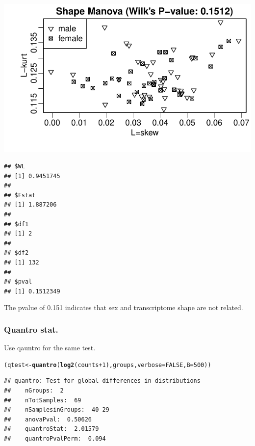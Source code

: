 \documentclass{article}\usepackage[]{graphicx}\usepackage[usenames,dvipsnames]{color}
\makeatletter
\def\maxwidth{ %
  \ifdim\Gin@nat@width>\linewidth
    \linewidth
  \else
    \Gin@nat@width
  \fi
}
\newcommand{\hlnum}[1]{\textcolor[rgb]{0.686,0.059,0.569}{#1}}%
\newcommand{\hlopt}[1]{\textcolor[rgb]{0,0,0}{#1}}%
\newcommand{\hlstd}[1]{\textcolor[rgb]{0.345,0.345,0.345}{#1}}%
\newcommand{\hlkwb}[1]{\textcolor[rgb]{0.69,0.353,0.396}{#1}}%
\newcommand{\hlkwc}[1]{\textcolor[rgb]{0.333,0.667,0.333}{#1}}%
\newcommand{\hlkwd}[1]{\textcolor[rgb]{0.737,0.353,0.396}{\textbf{#1}}}%
\newenvironment{kframe}{%
 \def\at@end@of@kframe{}%
 \ifinner\ifhmode%
  \def\at@end@of@kframe{\end{minipage}}%
  \begin{minipage}{\columnwidth}%
 \fi\fi%
 \def\FrameCommand##1{\hskip\@totalleftmargin \hskip-\fboxsep
 \colorbox{shadecolor}{##1}\hskip-\fboxsep
     \hskip-\linewidth \hskip-\@totalleftmargin \hskip\columnwidth}%
 \MakeFramed {\advance\hsize-\width
   \@totalleftmargin\z@ \linewidth\hsize
   \@setminipage}}%
 {\par\unskip\endMakeFramed%
 \at@end@of@kframe}
\newenvironment{knitrout}{}{} %
\makeatother
\begin{document}
\begin{knitrout}
\color{fgcolor}

{\centering \includegraphics[width=\maxwidth]{figure/lrats-1} 

}


\begin{kframe}\begin{verbatim}
## $WL
## [1] 0.9451745
## 
## $Fstat
## [1] 1.887206
## 
## $df1
## [1] 2
## 
## $df2
## [1] 132
## 
## $pval
## [1] 0.1512349
\end{verbatim}
\end{kframe}
\end{knitrout}

The pvalue of 0.151 indicates that sex and transcriptome shape are not
related.

\subsubsection{Quantro stat.}

Use qauntro for the same test. 

\begin{knitrout}
\color{fgcolor}\begin{kframe}
\begin{alltt}
\hlstd{(qtest} \hlkwb{<-} \hlkwd{quantro}\hlstd{(}\hlkwd{log2}\hlstd{(counts}\hlopt{+}\hlnum{1}\hlstd{), groups,} \hlkwc{verbose}\hlstd{=}\hlnum{FALSE}\hlstd{,} \hlkwc{B}\hlstd{=}\hlnum{500}\hlstd{))}
\end{alltt}
\begin{verbatim}
## quantro: Test for global differences in distributions
##    nGroups:  2 
##    nTotSamples:  69 
##    nSamplesinGroups:  40 29 
##    anovaPval:  0.50626 
##    quantroStat:  2.01579 
##    quantroPvalPerm:  0.094
\end{verbatim}
\end{kframe}
\end{knitrout}
\end{document}
